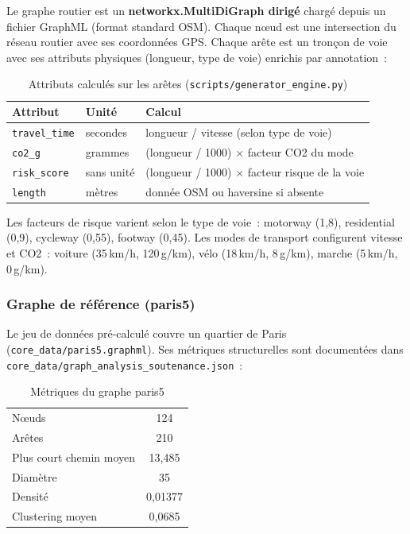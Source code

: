 \documentclass[a4paper, 12pt, twoside]{article}
\begin{document}
Le graphe routier est un \textbf{networkx.MultiDiGraph dirig\'{e}} charg\'{e} depuis un fichier
GraphML (format standard OSM). Chaque n\oe ud est une intersection du r\'{e}seau routier avec
ses coordonn\'{e}es GPS. Chaque ar\^{e}te est un tron\c{c}on de voie avec ses attributs physiques
(longueur, type de voie) enrichis par annotation~:

\begin{table}[h]
  \begin{center}
    \begin{tabular}{|l|l|l|}
      \hline
      \textbf{Attribut} & \textbf{Unit\'{e}} & \textbf{Calcul} \\
      \hline
      \texttt{travel\_time} & secondes & longueur / vitesse (selon type de voie) \\
      \texttt{co2\_g} & grammes & (longueur / 1000) $\times$ facteur CO2 du mode \\
      \texttt{risk\_score} & sans unit\'{e} & (longueur / 1000) $\times$ facteur risque de la voie \\
      \texttt{length} & m\`{e}tres & donn\'{e}e OSM ou haversine si absente \\
      \hline
    \end{tabular}
  \end{center}
  \caption{Attributs calcul\'{e}s sur les ar\^{e}tes (\texttt{scripts/generator\_engine.py})}
  \label{tab:edge-attrs}
\end{table}

Les facteurs de risque varient selon le type de voie~: motorway (1,8), residential (0,9),
cycleway (0,55), footway (0,45). Les modes de transport configurent vitesse et CO2~:
voiture (35\,km/h, 120\,g/km), v\'{e}lo (18\,km/h, 8\,g/km), marche (5\,km/h, 0\,g/km).

\subsubsection{Graphe de r\'{e}f\'{e}rence (paris5)}

Le jeu de donn\'{e}es pr\'{e}-calcul\'{e} couvre un quartier de Paris (\texttt{core\_data/paris5.graphml}).
Ses m\'{e}triques structurelles sont document\'{e}es dans \texttt{core\_data/graph\_analysis\_soutenance.json}~:

\begin{table}[h]
  \begin{center}
    \begin{tabular}{|l|c|}
      \hline
      N\oe uds & 124 \\
      Ar\^{e}tes & 210 \\
      Plus court chemin moyen & 13,485 \\
      Diam\`{e}tre & 35 \\
      Densit\'{e} & 0,01377 \\
      Clustering moyen & 0,0685 \\
      \hline
    \end{tabular}
  \end{center}
  \caption{M\'{e}triques du graphe paris5}
  \label{tab:graph-metrics}
\end{table}
\end{document}
